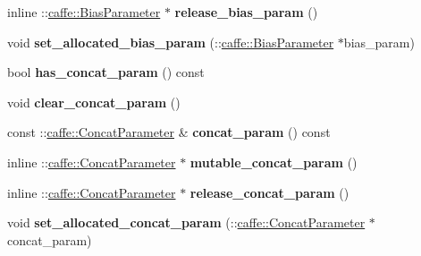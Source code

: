 \begin{DoxyCompactItemize}
inline \+::\mbox{\hyperlink{classcaffe_1_1_bias_parameter}{caffe\+::\+Bias\+Parameter}} $\ast$ {\bfseries release\+\_\+bias\+\_\+param} ()
\item 
\mbox{\label{classcaffe_1_1_layer_parameter_a3667579d7205f6e996df9e8b0fcdee68}} 
void {\bfseries set\+\_\+allocated\+\_\+bias\+\_\+param} (\+::\mbox{\hyperlink{classcaffe_1_1_bias_parameter}{caffe\+::\+Bias\+Parameter}} $\ast$bias\+\_\+param)
\item 
\mbox{\label{classcaffe_1_1_layer_parameter_ad504a9b9a954f6927e33259a4f5eba72}} 
bool {\bfseries has\+\_\+concat\+\_\+param} () const
\item 
\mbox{\label{classcaffe_1_1_layer_parameter_ab1dc0a77883e4e2ad6d0760137b3bcef}} 
void {\bfseries clear\+\_\+concat\+\_\+param} ()
\item 
\mbox{\label{classcaffe_1_1_layer_parameter_a6032ca4737ed9bf62d6e99fda7b0e919}} 
const \+::\mbox{\hyperlink{classcaffe_1_1_concat_parameter}{caffe\+::\+Concat\+Parameter}} \& {\bfseries concat\+\_\+param} () const
\item 
\mbox{\label{classcaffe_1_1_layer_parameter_aff7513b71daf8729e5817dc8efb87214}} 
inline \+::\mbox{\hyperlink{classcaffe_1_1_concat_parameter}{caffe\+::\+Concat\+Parameter}} $\ast$ {\bfseries mutable\+\_\+concat\+\_\+param} ()
\item 
\mbox{\label{classcaffe_1_1_layer_parameter_a21ef1971f61afe34426d5bc8cdf2ba3d}} 
inline \+::\mbox{\hyperlink{classcaffe_1_1_concat_parameter}{caffe\+::\+Concat\+Parameter}} $\ast$ {\bfseries release\+\_\+concat\+\_\+param} ()
\item 
\mbox{\label{classcaffe_1_1_layer_parameter_ae45902735e24908d79a909e6237d33e2}} 
void {\bfseries set\+\_\+allocated\+\_\+concat\+\_\+param} (\+::\mbox{\hyperlink{classcaffe_1_1_concat_parameter}{caffe\+::\+Concat\+Parameter}} $\ast$concat\+\_\+param)
\item 
\mbox{\label{classcaffe_1_1_layer_parameter_a03f2544f97a480bd2f960a0392d34314}} 

\end{DoxyCompactItemize}
